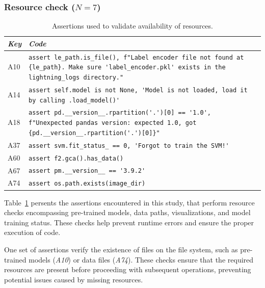 \subsubsection{Resource check ($N = 7$)}

\begin{table}
  \centering
  \begin{tabular}{@{}m{} m{}@{}}
    \toprule
    \emph{\textbf{Key}}&
    \emph{\textbf{Code}}\\
    \midrule

    A10 &
    \lstinline[]$assert le_path.is_file(), f"Label encoder file not found at {le_path}. Make sure 'label_encoder.pkl' exists in the lightning_logs directory."$\\

    A14 &
    \lstinline[]$assert self.model is not None, 'Model is not loaded, load it by calling .load_model()'$\\

    A18&
    \lstinline[]$assert pd.__version__.rpartition('.')[0] == '1.0', f"Unexpected pandas version: expected 1.0, got {pd.__version__.rpartition('.')[0]}"$\\

    A37 &
    \lstinline[]$assert svm.fit_status_ == 0, 'Forgot to train the SVM!'$\\

    A60 &
    \lstinline[]$assert f2.gca().has_data()$\\

    A67&
    \lstinline[]$assert pm.__version__ == '3.9.2'$\\

    A74 &
    \lstinline[]$assert os.path.exists(image_dir)$\\
    \bottomrule
  \end{tabular}
  \caption{Assertions used to validate availability of resources.}
  \label{tab:assert-resource-check}
\end{table}

Table~\ref{tab:assert-resource-check} persents the assertions encountered in this study, that perform resource checks encompassing pre-trained models, data paths, visualizations, and model training status. These checks help prevent runtime errors and ensure the proper execution of code.

One set of assertions verify the existence of files on the file system, such as pre-trained models (\emph{A10}) or data files (\emph{A74}). These checks ensure that the required resources are present before proceeding with subsequent operations, preventing potential issues caused by missing resources.

